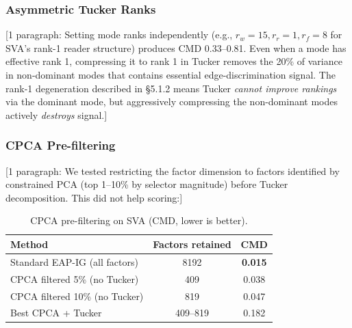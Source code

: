\documentclass[11pt]{article}
\begin{document}
\subsubsection{Asymmetric Tucker Ranks}


[1 paragraph: Setting mode ranks independently (e.g., $r_w=15, r_r=1,
r_f=8$ for SVA's rank-1 reader structure) produces CMD 0.33--0.81.
Even when a mode has effective rank 1, compressing it to rank 1 in
Tucker removes the 20\% of variance in non-dominant modes that contains
essential edge-discrimination signal. The rank-1 degeneration described
in \S5.1.2 means Tucker \emph{cannot improve rankings} via the dominant
mode, but aggressively compressing the non-dominant modes actively
\emph{destroys} signal.]

\subsubsection{CPCA Pre-filtering}


[1 paragraph: We tested restricting the factor dimension to factors
identified by constrained PCA (top 1--10\% by selector magnitude)
before Tucker decomposition. This did not help scoring:]

\begin{table}[h]
\centering
\caption{CPCA pre-filtering on SVA (CMD, lower is better).}
\label{tab:tucker_cpca}
\begin{tabular}{lcc}
\toprule
\textbf{Method} & \textbf{Factors retained} & \textbf{CMD} \\
\midrule
Standard EAP-IG (all factors) & 8192 & \textbf{0.015} \\
CPCA filtered 5\% (no Tucker) & 409 & 0.038 \\
CPCA filtered 10\% (no Tucker) & 819 & 0.047 \\
Best CPCA + Tucker & 409--819 & 0.182 \\
\bottomrule
\end{tabular}
\end{table}
\end{document}
